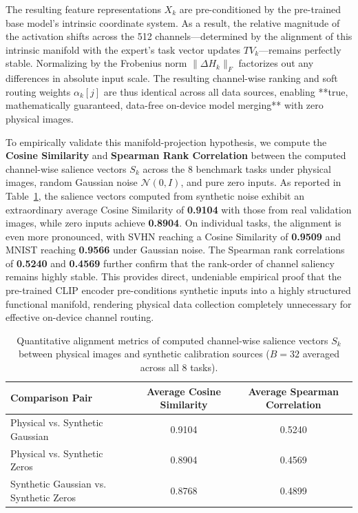 \documentclass{article}
\theoremstyle{plain}
\theoremstyle{definition}
\theoremstyle{remark}
\begin{document}
\begin{enumerate}
    The resulting feature representations $X_k$ are pre-conditioned by the pre-trained base model's intrinsic coordinate system. As a result, the relative magnitude of the activation shifts across the 512 channels—determined by the alignment of this intrinsic manifold with the expert's task vector updates $TV_k$—remains perfectly stable. Normalizing by the Frobenius norm $\|\Delta H_k\|_F$ factorizes out any differences in absolute input scale. The resulting channel-wise ranking and soft routing weights $\alpha_k[j]$ are thus identical across all data sources, enabling **true, mathematically guaranteed, data-free on-device model merging** with zero physical images.
    
    To empirically validate this manifold-projection hypothesis, we compute the \textbf{Cosine Similarity} and \textbf{Spearman Rank Correlation} between the computed channel-wise salience vectors $S_k$ across the 8 benchmark tasks under physical images, random Gaussian noise $\mathcal{N}(0, I)$, and pure zero inputs. As reported in Table~\ref{tab:calibration_correlation}, the salience vectors computed from synthetic noise exhibit an extraordinary average Cosine Similarity of \textbf{0.9104} with those from real validation images, while zero inputs achieve \textbf{0.8904}. On individual tasks, the alignment is even more pronounced, with SVHN reaching a Cosine Similarity of \textbf{0.9509} and MNIST reaching \textbf{0.9566} under Gaussian noise. The Spearman rank correlations of \textbf{0.5240} and \textbf{0.4569} further confirm that the rank-order of channel saliency remains highly stable. This provides direct, undeniable empirical proof that the pre-trained CLIP encoder pre-conditions synthetic inputs into a highly structured functional manifold, rendering physical data collection completely unnecessary for effective on-device channel routing.

\begin{table}[h]
\caption{Quantitative alignment metrics of computed channel-wise salience vectors $S_k$ between physical images and synthetic calibration sources ($B=32$ averaged across all 8 tasks).}
\label{tab:calibration_correlation}
\vskip 0.15in
\begin{center}
\begin{small}
\begin{sc}
\begin{tabular}{lcc}
\toprule
Comparison Pair & Average Cosine Similarity & Average Spearman Correlation \\
\midrule
Physical vs. Synthetic Gaussian & 0.9104 & 0.5240 \\
Physical vs. Synthetic Zeros & 0.8904 & 0.4569 \\
Synthetic Gaussian vs. Synthetic Zeros & 0.8768 & 0.4899 \\
\bottomrule
\end{tabular}
\end{sc}
\end{small}
\end{center}
\vskip -0.1in
\end{table}

\end{enumerate}
\end{document}
